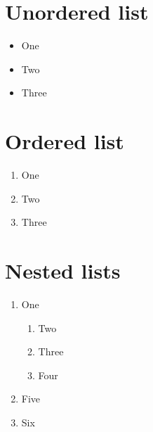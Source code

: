 \documentclass{article}
\begin{document}
\section{Unordered list}
\begin{itemize}
	\item One
	\item Two
	\item Three
\end{itemize}

\section{Ordered list}
\begin{enumerate}
    \item One
    \item Two
    \item Three
\end{enumerate}

\section{Nested lists}
\begin{enumerate}
	 \item One
    	\begin{enumerate}
        		\item Two
      		  \item Three
       		 \item Four
   	 \end{enumerate}
    	\item Five
    	\item Six
\end{enumerate}
\end{document}
